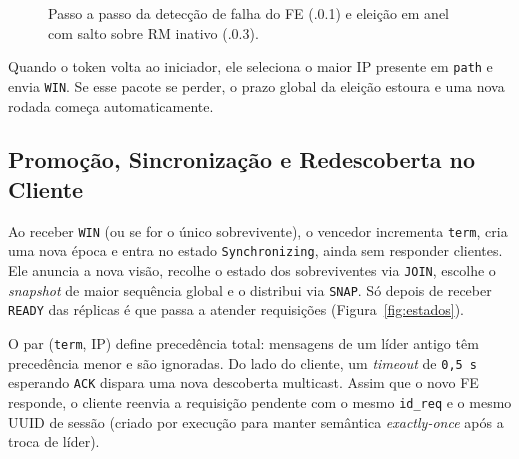 \documentclass[12pt]{article}
\begin{document}
\begin{figure}[ht]
{%
}
\caption{Passo a passo da detecção de falha do FE (.0.1) e eleição em anel com salto sobre RM inativo (.0.3).}
\label{fig:anel}
\end{figure}

Quando o token volta ao iniciador, ele seleciona o maior IP presente em \texttt{path} e envia \texttt{WIN}. Se esse pacote se perder, o prazo global da eleição estoura e uma nova rodada começa automaticamente.

\subsection{Promoção, Sincronização e Redescoberta no Cliente}

Ao receber \texttt{WIN} (ou se for o único sobrevivente), o vencedor incrementa \texttt{term}, cria uma nova época e entra no estado \texttt{Synchronizing}, ainda sem responder clientes. Ele anuncia a nova visão, recolhe o estado dos sobreviventes via \texttt{JOIN}, escolhe o \textit{snapshot} de maior sequência global e o distribui via \texttt{SNAP}. Só depois de receber \texttt{READY} das réplicas é que passa a atender requisições (Figura~\ref{fig:estados}).

O par (\texttt{term}, IP) define precedência total: mensagens de um líder antigo têm precedência menor e são ignoradas. Do lado do cliente, um \textit{timeout} de \texttt{0,5\,s} esperando \texttt{ACK} dispara uma nova descoberta multicast. Assim que o novo FE responde, o cliente reenvia a requisição pendente com o mesmo \texttt{id\_req} e o mesmo UUID de sessão (criado por execução para manter semântica \textit{exactly-once} após a troca de líder).
\end{document}
